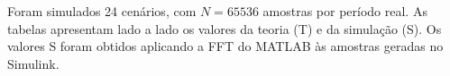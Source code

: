 Foram simulados 24 cenários, com $N=65536$ amostras por período real. As tabelas apresentam lado a lado os valores da teoria (T) e da simulação (S). Os valores S foram obtidos aplicando a FFT do MATLAB às amostras geradas no Simulink.
